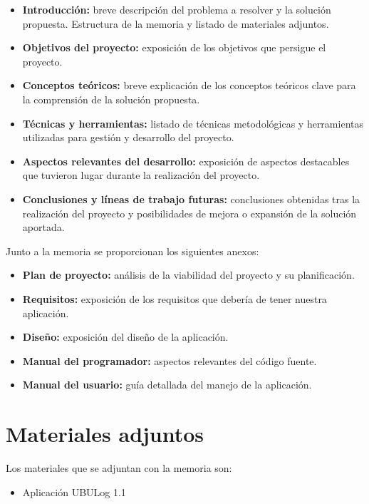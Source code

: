 \begin{itemize}
	\tightlist
	\item
	\textbf{Introducción:} breve descripción del problema a resolver y la
	solución propuesta. Estructura de la memoria y listado de materiales
	adjuntos.
	\item
	\textbf{Objetivos del proyecto:} exposición de los objetivos que
	persigue el proyecto.
	\item
	\textbf{Conceptos teóricos:} breve explicación de los conceptos
	teóricos clave para la comprensión de la solución propuesta.
	\item
	\textbf{Técnicas y herramientas:} listado de técnicas metodológicas y
	herramientas utilizadas para gestión y desarrollo del proyecto.
	\item
	\textbf{Aspectos relevantes del desarrollo:} exposición de aspectos
	destacables que tuvieron lugar durante la realización del proyecto.
	\item
	\textbf{Conclusiones y líneas de trabajo futuras:} conclusiones
	obtenidas tras la realización del proyecto y posibilidades de mejora o
	expansión de la solución aportada.
\end{itemize}

Junto a la memoria se proporcionan los siguientes anexos:

\begin{itemize}
	\tightlist
	\item
	\textbf{Plan de proyecto:} análisis de la viabilidad del proyecto y su planificación.
	\item
	\textbf{Requisitos:} exposición de los requisitos que debería de tener nuestra aplicación.
	\item
	\textbf{Diseño:} exposición del diseño de la aplicación.
	\item
	\textbf{Manual del programador:} aspectos relevantes del código fuente.
	\item
	\textbf{Manual del usuario:} guía detallada del manejo de la aplicación.
\end{itemize}

\section{Materiales adjuntos}\label{materiales-adjuntos}

Los materiales que se adjuntan con la memoria son: 

\begin{itemize}
	\tightlist
	\item
	Aplicación UBULog 1.1
\end{itemize}

